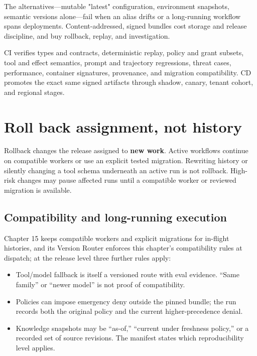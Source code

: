 The alternatives—mutable "latest" configuration, environment snapshots, semantic versions alone—fail when an alias drifts or a long-running workflow spans deployments. Content-addressed, signed bundles cost storage and release discipline, and buy rollback, replay, and investigation.\par

CI verifies types and contracts, deterministic replay, policy and grant subsets, tool and effect semantics, prompt and trajectory regressions, threat cases, performance, container signatures, provenance, and migration compatibility. CD promotes the exact same signed artifacts through shadow, canary, tenant cohort, and regional stages.\par

\section{Roll back assignment, not history}

Rollback changes the release assigned to \textbf{new work}. Active workflows continue on compatible workers or use an explicit tested migration. Rewriting history or silently changing a tool schema underneath an active run is not rollback. High-risk changes may pause affected runs until a compatible worker or reviewed migration is available.\par

\subsection{Compatibility and long-running execution}

Chapter 15 keeps compatible workers and explicit migrations for in-flight histories, and its Version Router enforces this chapter's compatibility rules at dispatch; at the release level three further rules apply:\par

\begin{itemize}

\item Tool/model fallback is itself a versioned route with eval evidence. “Same family” or “newer model” is not proof of compatibility.

\item Policies can impose emergency deny outside the pinned bundle; the run records both the original policy and the current higher-precedence denial.

\item Knowledge snapshots may be “as-of,” “current under freshness policy,” or a recorded set of source revisions. The manifest states which reproducibility level applies.

\end{itemize}

